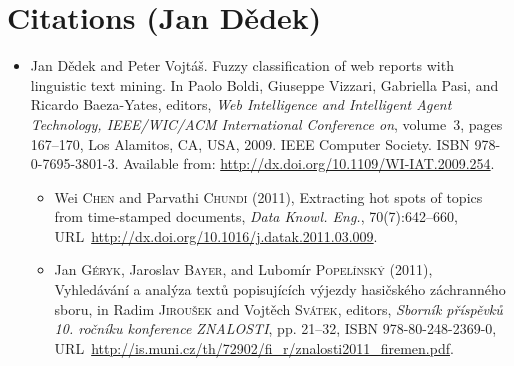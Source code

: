 \documentclass[12pt,a4paper,oneside,notitlepage]{article}
\newcommand{\urlprefix}{URL~}
\begin{document}
\section*{Citations (Jan D{\v{e}}dek)}



\begin{itemize}

\item
Jan D{\v{e}}dek and Peter Vojt{\'{a}}{\v{s}}.
\newblock Fuzzy classification of web reports with linguistic text mining.
\newblock In Paolo Boldi, Giuseppe Vizzari, Gabriella Pasi, and Ricardo
  Baeza-Yates, editors, {\em Web Intelligence and Intelligent Agent Technology,
  IEEE/WIC/ACM International Conference on}, volume~3, pages 167--170, Los
  Alamitos, CA, USA, 2009. IEEE Computer Society.
\newblock ISBN 978-0-7695-3801-3.
\newblock Available from: \url{http://dx.doi.org/10.1109/WI-IAT.2009.254}.

\begin{itemize}
\item
Wei \textsc{Chen} and Parvathi \textsc{Chundi} (2011), Extracting hot spots of
  topics from time-stamped documents, \emph{Data Knowl. Eng.}, 70(7):642--660,
  \urlprefix\url{http://dx.doi.org/10.1016/j.datak.2011.03.009}.
	
\item
Jan \textsc{G{\'e}ryk}, Jaroslav \textsc{Bayer}, and Lubom{\'i}r
  \textsc{Popel{\'i}nsk{\'y}} (2011), Vyhled{\'a}v{\'a}n{\'i} a anal{\'y}za
  text{\r{u}} popisuj{\'i}c{\'i}ch v{\'y}jezdy hasi{\v{c}}sk{\'e}ho
  z{\'a}chrann{\'e}ho sboru, in Radim \textsc{Jirou{\v{s}}ek} and Vojt{\v{e}}ch
  \textsc{Sv{\'a}tek}, editors, \emph{Sborn{\'i}k
  p{\v{r}}{\'i}sp{\v{e}}vk{\r{u}} 10. ro{\v{c}}n{\'i}ku konference ZNALOSTI},
  pp. 21--32, ISBN 978-80-248-2369-0,
  \urlprefix\url{http://is.muni.cz/th/72902/fi_r/znalosti2011_firemen.pdf}.	
	
%
\end{itemize}



\end{itemize}
\end{document}
